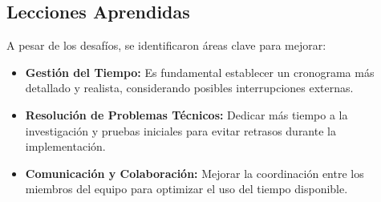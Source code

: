 \subsection*{Lecciones Aprendidas}
A pesar de los desafíos, se identificaron áreas clave para mejorar:
\begin{itemize}
    \item \textbf{Gestión del Tiempo:} Es fundamental establecer un cronograma más detallado y realista, considerando posibles interrupciones externas.
    \item \textbf{Resolución de Problemas Técnicos:} Dedicar más tiempo a la investigación y pruebas iniciales para evitar retrasos durante la implementación.
    \item \textbf{Comunicación y Colaboración:} Mejorar la coordinación entre los miembros del equipo para optimizar el uso del tiempo disponible.
\end{itemize}